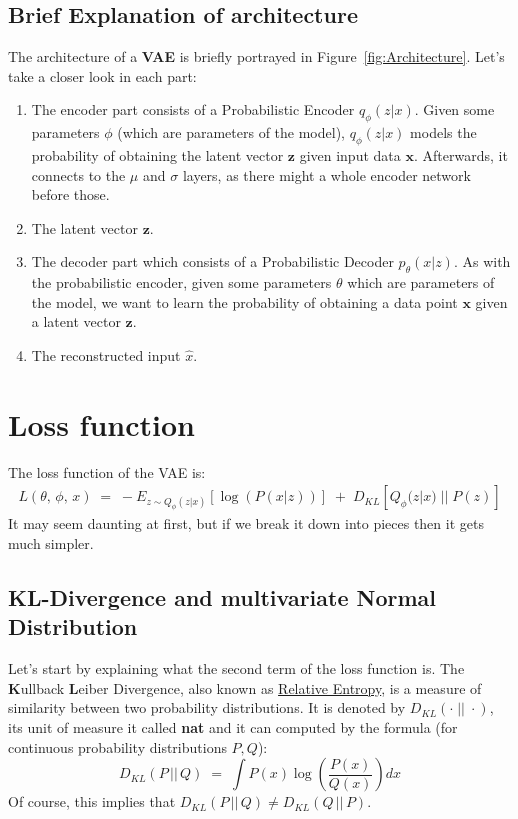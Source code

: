 \documentclass[12pt]{report}
\begin{document}
\subsection*{Brief Explanation of architecture}
The architecture of a \textbf{VAE} is briefly portrayed in 
Figure~\ref{fig:Architecture}. Let's take a closer look in each part:

\begin{enumerate}
    \item The encoder part consists of a Probabilistic Encoder $q_{\phi}(z | x)$.
        Given some parameters $\phi$ (which are parameters of the model),
        $q_{\phi}(z | x)$ models the probability of obtaining the latent vector
        $\textbf{z}$ given input data $\textbf{x}$. Afterwards, it connects to
        the $\mu$ and $\sigma$ layers, as there might a whole encoder network
        before those.
    \item The latent vector $\textbf{z}$.
    \item The decoder part which consists of a Probabilistic Decoder
        $p_{\theta}(x | z)$. As with the probabilistic encoder, given some
        parameters $\theta$ which are parameters of the model, we want to learn
        the probability of obtaining a data point $\textbf{x}$ given a latent
        vector $\textbf{z}$.
    \item The reconstructed input $\hat{x}$.
\end{enumerate}
\clearpage

\section*{Loss function}
The loss function of the VAE is:
\begin{align*}
    L(\theta,\, \phi,\, x) \;=\; -E_{z \sim Q_{\phi}(z | x)}
                                    \left[\log(P(x | z)) \right]\;
                              +\; D_{KL}\left[Q_{\phi}(z | x) \;||\; P(z) \right]
\end{align*}
It may seem daunting at first, but if we break it down into pieces then it gets
much simpler.

\subsection*{KL-Divergence and multivariate Normal Distribution}
Let's start by explaining what the second term of the loss function is. The
\textbf{K}ullback \textbf{L}eiber Divergence, also known as
\href{https://en.wikipedia.org/wiki/Relative_entropy}{Relative Entropy}, is
a measure of similarity between two probability distributions. It is denoted by
$D_{KL}(\cdot \;||\; \cdot)$, its unit of measure it called \textbf{nat} and it
can computed by the formula (for continuous probability distributions $P, Q$):
\begin{equation}\label{eq:KLD}
    D_{KL} (P \,||\, Q) \;=\; \int P(x) \log\left(\frac{P(x)}{Q(x)}\right) dx
\end{equation}
Of course, this implies that $D_{KL} (P \,||\, Q) \neq D_{KL} (Q \,||\, P)$.
\bigskip
\end{document}
